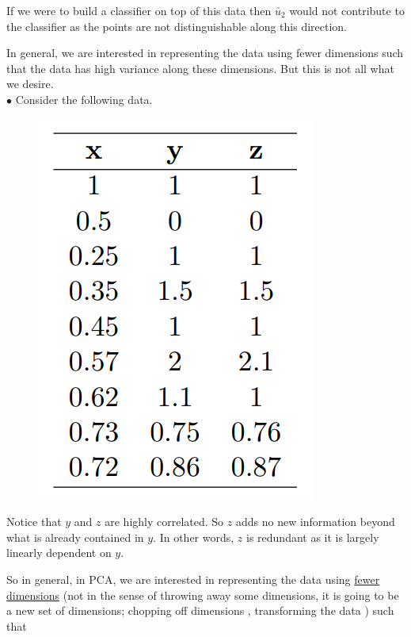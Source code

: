 \documentclass[11pt, a4paper]{article}
\begin{document}
If we were to build a classifier on top of this data then $\utilde{u_2}$ would not contribute to the classifier as the points are not distinguishable along this direction. \\

\hspace{0.3cm}

In general, we are interested in representing the data using fewer dimensions such that the data has high variance along these dimensions. But this is not all what we desire. \\[1.5em]

$\bullet$ Consider the following data.

\begin{figure}[!htbp]

\centering

\includegraphics[scale=0.5]{image_10.png}

\end{figure}

Notice that $y$ and $z$ are highly correlated. So $z$ adds no new information beyond what is already contained in $y$. In other words, $z$ is redundant as it is largely linearly dependent on $y$. \\

\hspace{0.3cm}

 So in general, in PCA, we are interested in representing the data using \underline{fewer dimensions} (not in the sense of throwing away some dimensions, it is going to be a new set of dimensions; chopping off dimensions  , transforming the data ) such that
\end{document}
